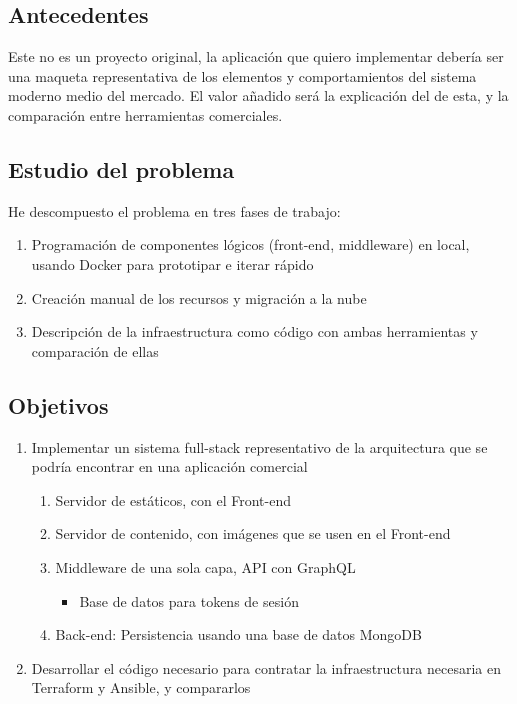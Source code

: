 \documentclass[11pt]{article}
\begin{document}
\begin{flushleft}
	\subsection{Antecedentes}
		Este no es un proyecto original, la aplicación que quiero implementar debería ser una maqueta representativa de los elementos y comportamientos del sistema moderno medio del mercado. El valor añadido será la explicación del de esta, y la comparación entre herramientas comerciales.

		
	\subsection{Estudio del problema}
		He descompuesto el problema en tres fases de trabajo:
		\begin{enumerate}
			\itemsep0em 
			\item Programación de componentes lógicos (front-end, middleware) en local, usando Docker para prototipar e iterar rápido
			\item Creación manual de los recursos y migración a la nube
			\item Descripción de la infraestructura como código con ambas herramientas y comparación de ellas
		\end{enumerate}
		
	\subsection{Objetivos}
		\begin{enumerate}
			\itemsep0em 
			\item Implementar un sistema full-stack representativo de la arquitectura que se podría encontrar en una aplicación comercial
				\begin{enumerate}
					\itemsep0em 
					\item Servidor de estáticos, con el Front-end
					\item Servidor de contenido, con imágenes que se usen en el Front-end
					\item Middleware de una sola capa, API con GraphQL
						\begin{itemize}
							\itemsep0em 
							\item Base de datos para tokens de sesión
						\end{itemize}
					\item Back-end: Persistencia usando una base de datos MongoDB
				\end{enumerate}
			\item Desarrollar el código necesario para contratar la infraestructura necesaria en Terraform y Ansible, y compararlos
		\end{enumerate}
















\end{flushleft}
\end{document}
